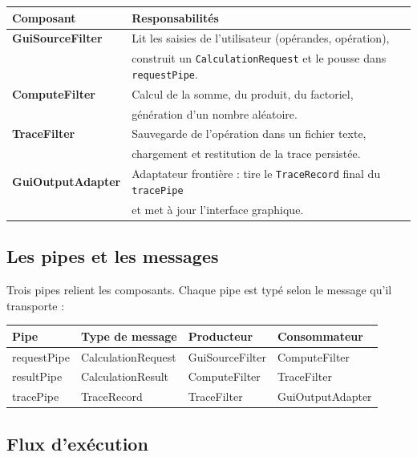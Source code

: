 \documentclass[12pt,a4paper]{article}
\begin{document}
\begin{center}
\begin{tabular}{>{\bfseries}p{3.5cm} p{9.5cm}}
\toprule
Composant & Responsabilités \\
\midrule
GuiSourceFilter &
  Lit les saisies de l'utilisateur (opérandes, opération), \\
& construit un \texttt{CalculationRequest} et le pousse dans \texttt{requestPipe}. \\
\midrule
ComputeFilter &
  Calcul de la somme, du produit, du factoriel, \\
& génération d'un nombre aléatoire. \\
\midrule
TraceFilter &
  Sauvegarde de l'opération dans un fichier texte, \\
& chargement et restitution de la trace persistée. \\
\midrule
GuiOutputAdapter &
  Adaptateur frontière : tire le \texttt{TraceRecord} final du \texttt{tracePipe} \\
& et met à jour l'interface graphique. \\
\bottomrule
\end{tabular}
\end{center}

\subsection{Les pipes et les messages}

Trois pipes relient les composants. Chaque pipe est typé selon le message qu'il transporte :

\begin{center}
\begin{tabular}{>{\ttfamily}p{4.5cm} p{3.8cm} p{3cm} p{2.5cm}}
\toprule
\normalfont\bfseries Pipe & Type de message & Producteur & Consommateur \\
\midrule
requestPipe  & CalculationRequest  & GuiSourceFilter  & ComputeFilter \\
resultPipe   & CalculationResult   & ComputeFilter    & TraceFilter   \\
tracePipe    & TraceRecord         & TraceFilter      & GuiOutputAdapter \\
\bottomrule
\end{tabular}
\end{center}

\subsection{Flux d'exécution}
\end{document}
